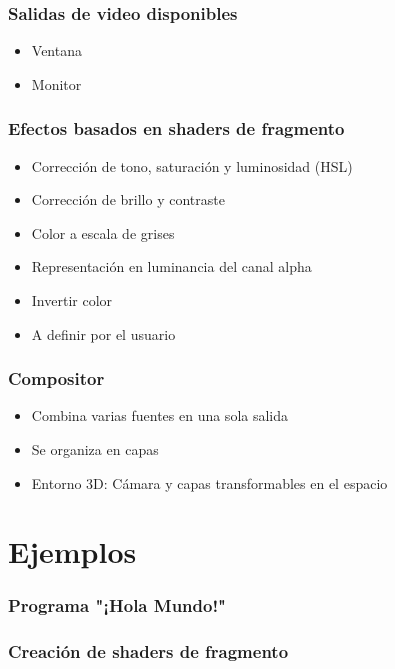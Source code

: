 \documentclass{beamer}
\begin{document}
\begin{frame}[t] \frametitle{Salidas de video disponibles}
	\begin{itemize}
		\item{Ventana}
		\item{Monitor}
	\end{itemize}
\end{frame}

\begin{frame}[t] \frametitle{Efectos basados en shaders de fragmento}
	\begin{itemize}
		\item{Corrección de tono, saturación y luminosidad (HSL)} \pause
		\item{Corrección de brillo y contraste} \pause
		\item{Color a escala de grises} \pause
		\item{Representación en luminancia del canal alpha}  \pause
		\item{Invertir color} \pause
		\item{A definir por el usuario}
	\end{itemize}
\end{frame}

\begin{frame}[t] \frametitle{Compositor}
	\begin{itemize}
		\item{Combina varias fuentes en una sola salida} \pause
		\item{Se organiza en capas}  \pause
		\item{Entorno 3D: Cámara y capas transformables en el espacio}
	\end{itemize}
\end{frame}

%
%
\section{Ejemplos}

\begin{frame}[t, allowframebreaks] \frametitle{Programa "¡Hola Mundo!"}
	
\end{frame}

\begin{frame}[t, allowframebreaks] \frametitle{Creación de shaders de fragmento}
	
	
	
		
\end{frame}
\end{document}
